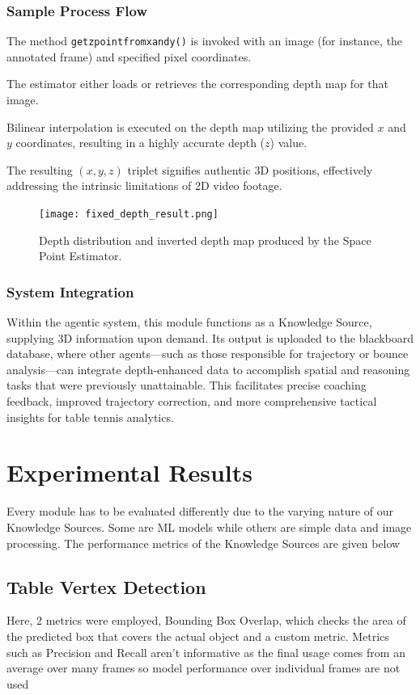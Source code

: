 \documentclass[conference]{IEEEtran}
\begin{document}
\subsubsection{Sample Process Flow}

The method \texttt{getzpointfromxandy()} is invoked with an image (for instance, the annotated frame) and specified pixel coordinates.

The estimator either loads or retrieves the corresponding depth map for that image.

Bilinear interpolation is executed on the depth map utilizing the provided $x$ and $y$ coordinates, resulting in a highly accurate depth ($z$) value.

The resulting $(x, y, z)$ triplet signifies authentic 3D positions, effectively addressing the intrinsic limitations of 2D video footage.

\begin{figure}
    \centering
    \texttt{[image: fixed\_depth\_result.png]}
    \caption{Depth distribution and inverted depth map produced by the Space Point Estimator.}
    \label{fig:placeholder}
\end{figure}

\subsubsection{System Integration}

Within the agentic system, this module functions as a Knowledge Source, supplying 3D information upon demand. Its output is uploaded to the blackboard database, where other agents—such as those responsible for trajectory or bounce analysis—can integrate depth-enhanced data to accomplish spatial and reasoning tasks that were previously unattainable. This facilitates precise coaching feedback, improved trajectory correction, and more comprehensive tactical insights for table tennis analytics.

\section{Experimental Results}
Every module has to be evaluated differently due to the varying nature of our Knowledge Sources. Some are ML models while others are simple data and image processing. The performance metrics of the Knowledge Sources are given below

\subsection{Table Vertex Detection}
Here, 2 metrics were employed, Bounding Box Overlap, which checks the area of the predicted box that covers the actual object and a custom metric. Metrics such as Precision and Recall aren't informative as the final usage comes from an average over many frames so model performance over individual frames are not used
\end{document}

